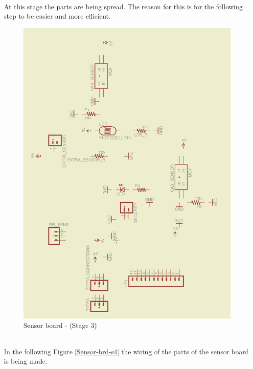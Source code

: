 \documentclass[12pt,a4paper]{report}
\begin{document}
\ \\
At this stage the parts are being spread. The reason for this is for the following step to be easier and more efficient.
\ \\
\begin{figure}[H]
\centering
\includegraphics*[scale=0.25]{sens_brd_s3}
\caption{Sensor board -  (Stage 3)}
\label{Sensor-brd-s3}
\end{figure}
\ \\
In the following Figure \ref{Sensor-brd-s4} the wiring of the parts of the sensor board is being made.
\ \\
\end{document}
